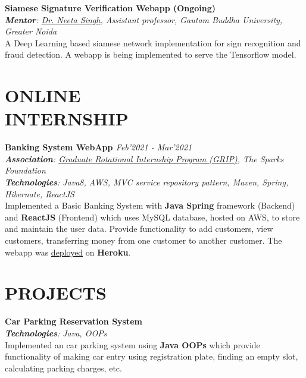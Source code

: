 \documentclass[resmargin]{res}
\begin{document}
\begin{resume}
\textbf{Siamese Signature Verification Webapp (Ongoing)} {\sl  \hfill}
\\{\sl \textbf{Mentor}: \href{https://sites.google.com/view/neetasingh112}{Dr. Neeta Singh}, Assistant professor, Gautam Buddha University, Greater Noida}
\\ A Deep Learning  based siamese network implementation for sign recognition and fraud detection. A webapp is being implemented to serve the Tensorflow model.

\section{ONLINE\\ INTERNSHIP}

\textbf{Banking System WebApp
\href{https://www.youtube.com/watch?v=uO6ZealjeIA}{}
\href{https://bank-management-service-app.herokuapp.com/}{}
\href{https://github.com/malavp1998/bank-management-service}{\faGitSquare} \href{https://github.com/malavp1998/bank-management-web}{\faGitSquare}} {\sl  \hfill Feb'2021 - Mar'2021}
\\{\sl \textbf{Association}: \href{https://www.thesparksfoundationsingapore.org/join-us/internship-positions/}{Graduate Rotational Internship Program (GRIP)}, The Sparks Foundation}
\\{\sl \textbf{Technologies}: Java8, AWS, MVC service repository pattern, Maven, Spring, Hibernate, ReactJS}
\\Implemented a Basic Banking System with \textbf{Java Spring} framework (Backend) and \textbf{ReactJS} (Frontend) which uses MySQL database, hosted on AWS, to store and maintain the user data.
Provide functionality to add customers, view customers, transferring money from one customer to another customer. The webapp was \href{https://bank-management-service-app.herokuapp.com/}{deployed} on \textbf{Heroku}.

\section{PROJECTS}

\textbf{Car Parking Reservation System \href{https://github.com/malavp1998/parking-lot}{\faGitSquare}
}{\sl\hfill}
\\{\sl \textbf{Technologies}: Java, OOPs}
\\ Implemented an car parking system using \textbf{Java OOPs} which provide functionality of making car entry using registration plate, finding an empty slot, calculating parking charges, etc. 


\end{resume}
\end{document}
